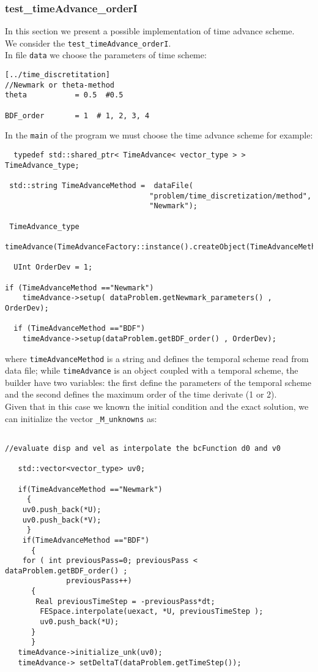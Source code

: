 \documentclass[english,a4paper]{article}
\begin{document}
\newpage
\clearpage
\subsubsection{test\_timeAdvance\_orderI}
In this section we present a possible implementation of time advance
scheme.\\
We consider the \verb"test_timeAdvance_orderI".\\
In file  \verb"data" we choose the parameters of time scheme:
\begin{verbatim}
[../time_discretitation]
//Newmark or theta-method
theta           = 0.5  #0.5

BDF_order       = 1  # 1, 2, 3, 4
\end{verbatim}
In the \verb"main" of the program we must choose the time advance scheme for
example:
\begin{verbatim}
  typedef std::shared_ptr< TimeAdvance< vector_type > >   TimeAdvance_type;

 std::string TimeAdvanceMethod =  dataFile(
                                 "problem/time_discretization/method",
                                 "Newmark");

 TimeAdvance_type
 timeAdvance(TimeAdvanceFactory::instance().createObject(TimeAdvanceMethod));

  UInt OrderDev = 1;

if (TimeAdvanceMethod =="Newmark")
    timeAdvance->setup( dataProblem.getNewmark_parameters() , OrderDev);

  if (TimeAdvanceMethod =="BDF")
    timeAdvance->setup(dataProblem.getBDF_order() , OrderDev);
\end{verbatim}
where \verb"timeAdvanceMethod" is a
string and defines the temporal scheme read  from data
file; while \verb"timeAdvance" is an object coupled with a temporal scheme,
the builder  have two variables: the first define the parameters of
the temporal scheme and the second
defines the maximum order of the
time derivate (1 or 2).\\
Given that in this case we known the initial condition and the exact
solution,  we can initialize the vector \verb"_M_unknowns" as:
\begin{verbatim}

//evaluate disp and vel as interpolate the bcFunction d0 and v0

   std::vector<vector_type> uv0;

   if(TimeAdvanceMethod =="Newmark")
     {
    uv0.push_back(*U);
    uv0.push_back(*V);
     }
    if(TimeAdvanceMethod =="BDF")
      {
	for ( int previousPass=0; previousPass < dataProblem.getBDF_order() ;
              previousPass++)
	  {
	   Real previousTimeStep = -previousPass*dt;
	    FESpace.interpolate(uexact, *U, previousTimeStep );
	    uv0.push_back(*U);
	  }
      }
   timeAdvance->initialize_unk(uv0);
   timeAdvance-> setDeltaT(dataProblem.getTimeStep());
\end{verbatim}
\end{document}

